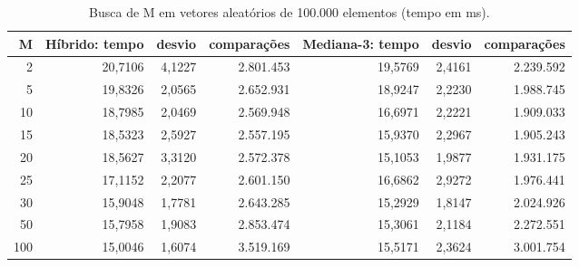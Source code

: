 \begin{table}[htbp]
  \centering
  \small
  \setlength{\tabcolsep}{4pt}
  \caption{Busca de M em vetores aleatórios de 100.000 elementos (tempo em ms).}
  \label{tab:busca-m-n100000}
  \begin{tabular}{rrrrrrr}
    \toprule
    M & Híbrido: tempo & desvio & comparações & Mediana-3: tempo & desvio & comparações \\
    \midrule
    2 & 20,7106 & 4,1227 & 2.801.453 & 19,5769 & 2,4161 & 2.239.592 \\
    5 & 19,8326 & 2,0565 & 2.652.931 & 18,9247 & 2,2230 & 1.988.745 \\
    10 & 18,7985 & 2,0469 & 2.569.948 & 16,6971 & 2,2221 & 1.909.033 \\
    15 & 18,5323 & 2,5927 & 2.557.195 & 15,9370 & 2,2967 & 1.905.243 \\
    20 & 18,5627 & 3,3120 & 2.572.378 & 15,1053 & 1,9877 & 1.931.175 \\
    25 & 17,1152 & 2,2077 & 2.601.150 & 16,6862 & 2,9272 & 1.976.441 \\
    30 & 15,9048 & 1,7781 & 2.643.285 & 15,2929 & 1,8147 & 2.024.926 \\
    50 & 15,7958 & 1,9083 & 2.853.474 & 15,3061 & 2,1184 & 2.272.551 \\
    100 & 15,0046 & 1,6074 & 3.519.169 & 15,5171 & 2,3624 & 3.001.754 \\
    \bottomrule
  \end{tabular}
\end{table}
